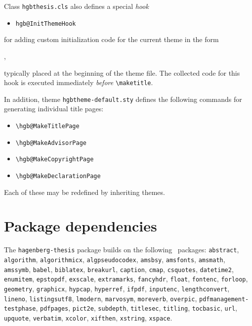 \documentclass[language=english]{hgbarticle}
\begin{document}
\noindent
Class \texttt{hgbthesis.cls} also defines a special \emph{hook}
\begin{itemize}
\item[] \verb!hgb@InitThemeHook!
\end{itemize}
for adding custom initialization code for the current theme in the form
%
\begin{LaTeXCode}[numbers=none]
,
\end{LaTeXCode}
%
typically placed at the beginning of the theme file. The collected code for
this hook is executed immediately \emph{before} \verb!\maketitle!.


In addition, theme \texttt{hgbtheme-default.sty} defines the following
commands for generating individual title pages:
%
\begin{itemize}
  \item[] \verb!\hgb@MakeTitlePage!
  \item[] \verb!\hgb@MakeAdvisorPage!
  \item[] \verb!\hgb@MakeCopyrightPage!
  \item[] \verb!\hgb@MakeDeclarationPage!
\end{itemize}
%
Each of these may be redefined by inheriting themes.

\section{Package dependencies}

\begin{sloppypar}
The \texttt{hagenberg-thesis} package builds on the following \latex\ packages:\newline
\texttt{abstract}, 
\texttt{algorithm}, 
\texttt{algorithmicx}, 
\texttt{algpseudocodex}, 
\texttt{amsbsy}, 
\texttt{amsfonts}, 
\texttt{amsmath}, 
\texttt{amssymb}, 
\texttt{babel}, 
\texttt{biblatex}, 
\texttt{breakurl}, 
\texttt{caption}, 
\texttt{cmap}, 
\texttt{csquotes}, 
\texttt{datetime2}, 
\texttt{enumitem}, 
\texttt{epstopdf}, 
\texttt{exscale},
\texttt{extramarks},
\texttt{fancyhdr}, 
\texttt{float}, 
\texttt{fontenc},
\texttt{forloop},
\texttt{geometry}, 
\texttt{graphicx}, 
\texttt{hypcap}, 
\texttt{hyperref}, 
\texttt{ifpdf}, 
\texttt{inputenc}, 
\texttt{lengthconvert},
\texttt{lineno},
\texttt{listingsutf8}, 
\texttt{lmodern},
\texttt{marvosym}, 
\texttt{moreverb}, 
\texttt{overpic}, 
\texttt{pdfmanagement-testphase}, 
\texttt{pdfpages}, 
\texttt{pict2e}, 
\texttt{subdepth}, 
\texttt{titlesec}, 
\texttt{titling},
\texttt{tocbasic},
\texttt{url}, 
\texttt{upquote}, 
\texttt{verbatim}, 
\texttt{xcolor}, 
\texttt{xifthen},
\texttt{xstring},
\texttt{xspace}.
\end{sloppypar}
\end{document}
